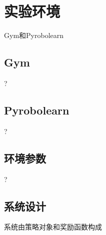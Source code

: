
\chapter{实验环境}

Gym和Pyrobolearn\cite{cnarticle}

\section{Gym}
?
\section{Pyrobolearn}
?
\section{环境参数}
?
\section{系统设计}

系统由策略对象和奖励函数构成

